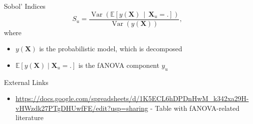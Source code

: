 \begin{frame}{Sobol' Indices}
\[
S_u = \frac{\operatorname{Var}\!\left( \mathbb{E}\left[ y(\boldsymbol{X}) \,\middle|\, \mathbf{X}_u = . \right] \right)}{\operatorname{Var}(y(\boldsymbol{X}))},
\]
where
\begin{itemize}
  \item $y(\boldsymbol{X})$ is the probabilistic model, which is decomposed
  \item $\mathbb{E}[y(\boldsymbol{X}) \mid \mathbf{X}_u = .]$ is the fANOVA component $y_u$
\end{itemize}
\end{frame}



\begin{frame}{External Links}
    \begin{itemize}
        \item \url{https://docs.google.com/spreadsheets/d/1K5ECL6hDPDnHwM_k342xa29H-vHWzdk27PTgDHUwfFE/edit?usp=sharing} - Table with fANOVA-related literature
    \end{itemize}
\end{frame}